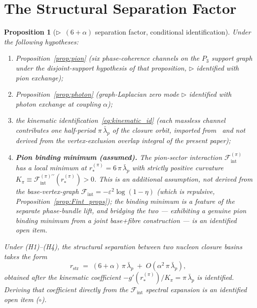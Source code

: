 \documentclass[12pt]{article}
\newtheorem{proposition}[theorem]{Proposition}
\newcommand{\Fcal}{\mathcal{F}}
\newcommand{\Fint}{\Fcal_{\mathrm{int}}}
\newcommand{\lbar}{\bar{\lambda}}
\begin{document}
\section{The Structural Separation Factor}\label{sec:combined}

\begin{proposition}[$\triangleright$\ $(6 + \alpha)$ separation factor, conditional identification]\label{thm:factor}
Under the following hypotheses:
\begin{enumerate}[label=\textup{(H\arabic*)}]
    \item Proposition~\ref{prop:pion} (six phase-coherence channels on the $P_3$ support graph under the disjoint-support hypothesis of that proposition, $\triangleright$ identified with pion exchange);
    \item Proposition~\ref{prop:photon} (graph-Laplacian zero mode $\triangleright$ identified with photon exchange at coupling $\alpha$);
    \item the kinematic identification~\eqref{eq:kinematic_id} (each massless channel contributes one half-period $\pi\,\lbar_p$ of the closure orbit, imported from~\citep{SmartRadius} and \emph{not} derived from the vertex-exclusion overlap integral of the present paper);
    \item \textbf{Pion binding minimum (assumed).} The pion-sector interaction $\Fint^{(\pi)}$ has a \emph{local minimum} at $r_*^{(\pi)} = 6\,\pi\,\lbar_p$ with strictly positive curvature $K_\pi \equiv \Fint^{(\pi)\prime\prime}(r_*^{(\pi)}) > 0$. This is an additional assumption, \emph{not} derived from the base-vertex-graph $\Fint = -\varepsilon^2\log(1-\eta)$ (which is repulsive, Proposition~\ref{prop:Fint_props}); the binding minimum is a feature of the separate phase-bundle lift, and bridging the two --- exhibiting a genuine pion binding minimum from a joint base+fibre construction --- is an identified open item.
\end{enumerate}
Under (H1)--(H4), the structural separation between two nucleon closure basins takes the form
\begin{equation}\label{eq:r_str}
    r_{\mathrm{str}} \;=\; (6 + \alpha)\,\pi\,\lbar_p \;+\; O(\alpha^2\,\pi\,\lbar_p),
\end{equation}
obtained after the kinematic coefficient $-g'(r_*^{(\pi)})/K_\pi = \pi\,\lbar_p$ is identified. Deriving that coefficient directly from the $\Fint$ spectral expansion is an identified open item ($\circ$).
\end{proposition}
\end{document}

